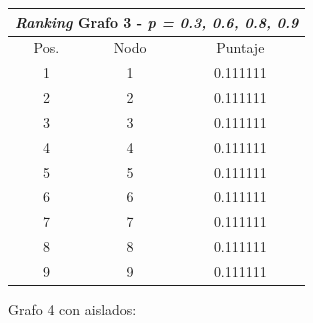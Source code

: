 \begin{center}
         \begin{tabular}{|c|c|c|}
                    \hline
                    \multicolumn{3}{|c||}{\emph{Ranking} Grafo 3 - \emph{p = 0.3, 0.6, 0.8, 0.9}} \\ \hline
Pos. & Nodo & Puntaje \\ \hline
1 & 1 & 0.111111 \\ 
2 & 2 & 0.111111 \\
3 & 3 & 0.111111 \\
4 & 4 & 0.111111 \\
5 & 5 & 0.111111  \\
6 & 6 & 0.111111  \\
7 & 7 & 0.111111   \\
8 & 8 & 0.111111 \\
9 & 9 & 0.111111  \\
 \hline

                \end{tabular}
            \end{center}
            
Grafo 4 con aislados:

